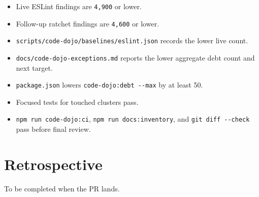 \begin{itemize}
\tightlist
\item
  Live ESLint findings are \texttt{4\allowbreak{},\allowbreak{}9\allowbreak{}0\allowbreak{}0} or lower.
\item
  Follow-up ratchet findings are \texttt{4\allowbreak{},\allowbreak{}6\allowbreak{}0\allowbreak{}0} or lower.
\item
  \texttt{s\allowbreak{}c\allowbreak{}r\allowbreak{}i\allowbreak{}p\allowbreak{}t\allowbreak{}s\allowbreak{}/\allowbreak{}c\allowbreak{}o\allowbreak{}d\allowbreak{}e\allowbreak{}-\allowbreak{}d\allowbreak{}o\allowbreak{}j\allowbreak{}o\allowbreak{}/\allowbreak{}b\allowbreak{}a\allowbreak{}s\allowbreak{}e\allowbreak{}l\allowbreak{}i\allowbreak{}n\allowbreak{}e\allowbreak{}s\allowbreak{}/\allowbreak{}e\allowbreak{}s\allowbreak{}l\allowbreak{}i\allowbreak{}n\allowbreak{}t\allowbreak{}.\allowbreak{}j\allowbreak{}s\allowbreak{}o\allowbreak{}n} records the lower live count.
\item
  \texttt{d\allowbreak{}o\allowbreak{}c\allowbreak{}s\allowbreak{}/\allowbreak{}c\allowbreak{}o\allowbreak{}d\allowbreak{}e\allowbreak{}-\allowbreak{}d\allowbreak{}o\allowbreak{}j\allowbreak{}o\allowbreak{}-\allowbreak{}e\allowbreak{}x\allowbreak{}c\allowbreak{}e\allowbreak{}p\allowbreak{}t\allowbreak{}i\allowbreak{}o\allowbreak{}n\allowbreak{}s\allowbreak{}.\allowbreak{}m\allowbreak{}d} reports the lower aggregate debt count and next target.
\item
  \texttt{p\allowbreak{}a\allowbreak{}c\allowbreak{}k\allowbreak{}a\allowbreak{}g\allowbreak{}e\allowbreak{}.\allowbreak{}j\allowbreak{}s\allowbreak{}o\allowbreak{}n} lowers \texttt{c\allowbreak{}o\allowbreak{}d\allowbreak{}e\allowbreak{}-\allowbreak{}d\allowbreak{}o\allowbreak{}j\allowbreak{}o\allowbreak{}:\allowbreak{}d\allowbreak{}e\allowbreak{}b\allowbreak{}t\allowbreak{} \allowbreak{}-\allowbreak{}-\allowbreak{}m\allowbreak{}a\allowbreak{}x} by at least 50.
\item
  Focused tests for touched clusters pass.
\item
  \texttt{n\allowbreak{}p\allowbreak{}m\allowbreak{} \allowbreak{}r\allowbreak{}u\allowbreak{}n\allowbreak{} \allowbreak{}c\allowbreak{}o\allowbreak{}d\allowbreak{}e\allowbreak{}-\allowbreak{}d\allowbreak{}o\allowbreak{}j\allowbreak{}o\allowbreak{}:\allowbreak{}c\allowbreak{}i}, \texttt{n\allowbreak{}p\allowbreak{}m\allowbreak{} \allowbreak{}r\allowbreak{}u\allowbreak{}n\allowbreak{} \allowbreak{}d\allowbreak{}o\allowbreak{}c\allowbreak{}s\allowbreak{}:\allowbreak{}i\allowbreak{}n\allowbreak{}v\allowbreak{}e\allowbreak{}n\allowbreak{}t\allowbreak{}o\allowbreak{}r\allowbreak{}y}, and \texttt{g\allowbreak{}i\allowbreak{}t\allowbreak{} \allowbreak{}d\allowbreak{}i\allowbreak{}f\allowbreak{}f\allowbreak{} \allowbreak{}-\allowbreak{}-\allowbreak{}c\allowbreak{}h\allowbreak{}e\allowbreak{}c\allowbreak{}k} pass before final review.
\end{itemize}

\section{Retrospective}\label{record-216-retrospective}

To be completed when the PR lands.

